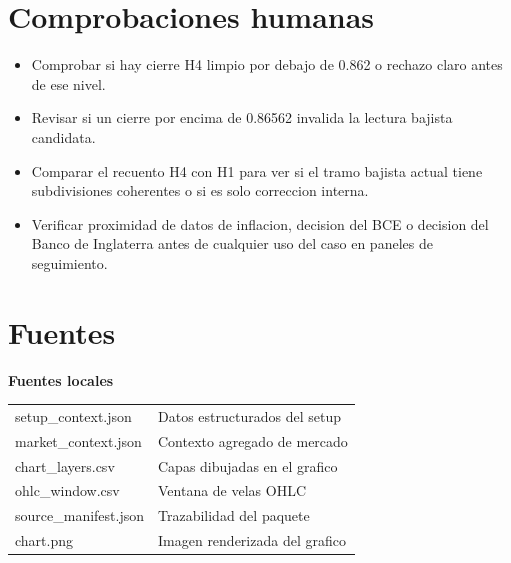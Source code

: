\documentclass[11pt,a4paper]{article}
\begin{document}
\section*{Comprobaciones humanas}
\begin{itemize}
  \item Comprobar si hay cierre H4 limpio por debajo de 0.862 o rechazo claro antes de ese nivel.
  \item Revisar si un cierre por encima de 0.86562 invalida la lectura bajista candidata.
  \item Comparar el recuento H4 con H1 para ver si el tramo bajista actual tiene subdivisiones coherentes o si es solo correccion interna.
  \item Verificar proximidad de datos de inflacion, decision del BCE o decision del Banco de Inglaterra antes de cualquier uso del caso en paneles de seguimiento.
\end{itemize}

\section*{Fuentes}
\textbf{Fuentes locales}\par
\begin{tabularx}{\textwidth}{p{4.2cm}X}
setup\_context.json & Datos estructurados del setup \\
market\_context.json & Contexto agregado de mercado \\
chart\_layers.csv & Capas dibujadas en el grafico \\
ohlc\_window.csv & Ventana de velas OHLC \\
source\_manifest.json & Trazabilidad del paquete \\
chart.png & Imagen renderizada del grafico \\
\end{tabularx}
\end{document}
